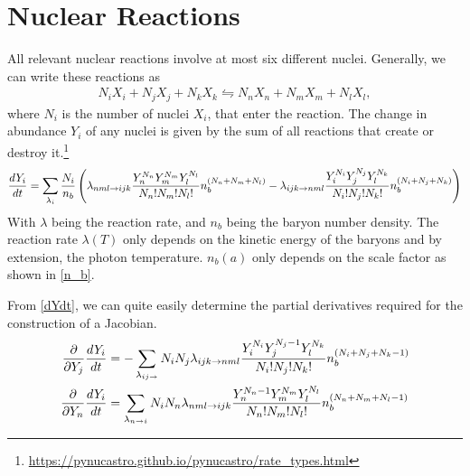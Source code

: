 %
%
\section{Nuclear Reactions}
\label{sec:nucleartheory}

All relevant nuclear reactions involve at most six different nuclei. Generally, we can write these reactions as
\begin{align}
    N_i X_i + N_j X_j + N_k X_k \leftrightharpoons N_n X_n + N_m X_m + N_l X_l ,
\end{align}
where $N_i$ is the number of nuclei $X_i$, that enter the reaction. 
The change in abundance $Y_i$ of any nuclei is given by the sum of all reactions that create or destroy it.\footnote{\url{https://pynucastro.github.io/pynucastro/rate_types.html}}
\begin{align}
    \frac{dY_i}{dt}=\sum_{\lambda_i}\frac{N_i}{n_b}\left(\lambda_{n m l \rightarrow i j k} \frac{Y_n^{N_n}Y_m^{N_m}Y_l^{N_l}}{N_n!N_m!N_l!}n_b^{(N_n+N_m+N_l)}-\lambda_{i j k \rightarrow n m l}\frac{Y_i^{N_i}Y_j^{N_j}Y_l^{N_k}}{N_i!N_j!N_k!}n_b^{(N_i+N_j+N_k)}\right)
    \label{dYdt}
\end{align}
With $\lambda$ being the reaction rate, and $n_b$ being the baryon number density. The reaction rate $\lambda(T)$ only depends on the kinetic energy of the baryons and by extension, the photon temperature. $n_b(a)$ only depends on the scale factor as shown in \eqref{n_b}. 

From \eqref{dYdt}, we can quite easily determine the partial derivatives required for the construction of a Jacobian. 
\begin{align}
    \frac{\partial }{\partial Y_j}\frac{dY_i}{dt}&=-\sum_{\lambda_{ij\rightarrow}}N_i N_j\lambda_{i j k \rightarrow n m l}\frac{Y_i^{N_i}Y_j^{N_j-1}Y_l^{N_k}}{N_i!N_j!N_k!}n_b^{(N_i+N_j+N_k-1)}\label{eq:jacterms1}\\
    \frac{\partial }{\partial Y_n}\frac{dY_i}{dt}&=\sum_{\lambda_{n \rightarrow i }}N_i N_n\lambda_{n m l \rightarrow i j k} \frac{Y_n^{N_n-1}Y_m^{N_m}Y_l^{N_l}}{N_n!N_m!N_l!}n_b^{(N_n+N_m+N_l-1)}
    \label{eq:jacterms2}
\end{align}


